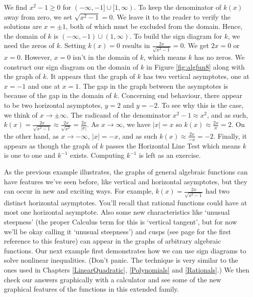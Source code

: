 {\begin{enumerate}
We find $x^2 - 1 \geq 0$ for $(-\infty, -1] \cup [1, \infty)$.  To keep the denominator of $k(x)$ away from zero, we set $\sqrt{x^2-1} = 0$. We leave it to the reader to verify the solutions are $x = \pm 1$, both of which must be excluded from the domain.    Hence, the domain of $k$ is $(-\infty, -1) \cup (1,\infty)$.  To build the sign diagram for $k$, we need the zeros of $k$.  Setting $k(x) = 0$ results in $\frac{2x}{\sqrt{x^2 - 1}}= 0$.  We get $2x =0$ or $x=0$.  However, $x=0$ isn't in the domain of $k$, which means $k$ has no zeros.  We construct our sign diagram on the domain of $k$ in Figure \ref{fig:algfun8} along with the graph of $k$. It appears that the graph of $k$ has two vertical asymptotes, one at $x=-1$ and one at $x=1$.   The gap in the graph between the asymptotes is because of the gap in the domain of $k$. Concerning end behaviour, there appear to be two horizontal asymptotes, $y = 2$ and $y=-2$.  To see why this is the case, we think of $x\rightarrow \pm \infty$.   The radicand of the denominator $x^2 - 1 \approx x^2$, and as such, $k(x) = \frac{2x}{\sqrt{x^2 - 1}} \approx \frac{2x}{\sqrt{x^2}} = \frac{2x}{|x|}$.  As $x \rightarrow \infty$, we have $|x| = x$ so $k(x) \approx \frac{2x}{x} = 2$.  On the other hand, as $x \rightarrow -\infty$, $|x| = -x$, and as such $k(x) \approx \frac{2x}{-x} = -2$. Finally, it appears as though the graph of $k$ passes the Horizontal Line Test which means $k$ is one to one and $k^{-1}$ exists.  Computing $k^{-1}$ is left as an exercise.

\end{enumerate}
}

As the previous example illustrates, the graphs of general algebraic functions can have features we've seen before, like vertical and horizontal asymptotes, but they can occur in new and exciting ways. For example, $k(x) = \frac{2x}{\sqrt{x^{2} - 1}}$ had two distinct horizontal asymptotes.  You'll recall that rational functions could have at most one horizontal asymptote.  Also some new characteristics like `unusual steepness' (the proper Calculus term for this is `vertical tangent', but for now we'll be okay calling it `unusual steepness') and cusps (see page \pageref{cusppicture} for the first reference to this feature) can appear in the graphs of arbitrary algebraic functions.   Our next example first demonstrates how we can use sign diagrams to solve nonlinear inequalities. (Don't panic.  The technique is very similar to the ones used in Chapters \ref{LinearQuadratic}, \ref{Polynomials} and \ref{Rationals}.)  We then check our answers graphically with a calculator and see some of the new graphical features of the functions in this extended family.


